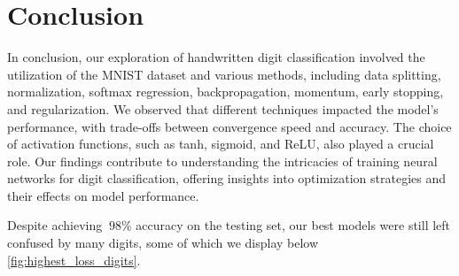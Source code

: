 \section{Conclusion}

In conclusion, our exploration of handwritten digit classification involved the utilization of the MNIST dataset and various methods, including data splitting, normalization, softmax regression, backpropagation, momentum, early stopping, and regularization. We observed that different techniques impacted the model's performance, with trade-offs between convergence speed and accuracy. The choice of activation functions, such as tanh, sigmoid, and ReLU, also played a crucial role. Our findings contribute to understanding the intricacies of training neural networks for digit classification, offering insights into optimization strategies and their effects on model performance.

Despite achieving $~98\%$ accuracy on the testing set, our best models were still left
confused by many digits, some of which we display below \cref{fig:highest_loss_digits}.
